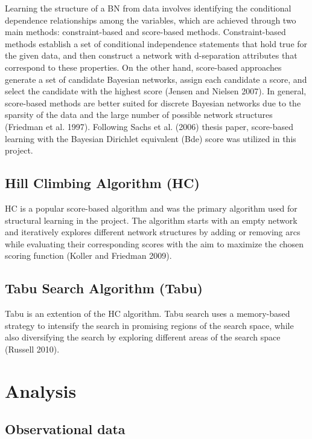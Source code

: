 \documentclass[twocol]{ametsoc}
\begin{document}
Learning the structure of a BN from data involves identifying the
conditional dependence relationships among the variables, which are
achieved through two main methods: constraint-based and score-based
methods. Constraint-based methods establish a set of conditional
independence statements that hold true for the given data, and then
construct a network with d-separation attributes that correspond to
these properties. On the other hand, score-based approaches generate a
set of candidate Bayesian networks, assign each candidate a score, and
select the candidate with the highest score (Jensen and Nielsen 2007).
In general, score-based methods are better suited for discrete Bayesian
networks due to the sparsity of the data and the large number of
possible network structures (Friedman et al. 1997). Following Sachs et
al. (2006) thesis paper, score-based learning with the Bayesian
Dirichlet equivalent (Bde) score was utilized in this project.

\hypertarget{hill-climbing-algorithm-hc}{%
\subsection{Hill Climbing Algorithm
(HC)}\label{hill-climbing-algorithm-hc}}

HC is a popular score-based algorithm and was the primary algorithm used
for structural learning in the project. The algorithm starts with an
empty network and iteratively explores different network structures by
adding or removing arcs while evaluating their corresponding scores with
the aim to maximize the chosen scoring function (Koller and Friedman
2009).

\hypertarget{tabu-search-algorithm-tabu}{%
\subsection{Tabu Search Algorithm
(Tabu)}\label{tabu-search-algorithm-tabu}}

Tabu is an extention of the HC algorithm. Tabu search uses a
memory-based strategy to intensify the search in promising regions of
the search space, while also diversifying the search by exploring
different areas of the search space (Russell 2010).

\hypertarget{analysis}{%
\section{Analysis}\label{analysis}}

\hypertarget{observational-data}{%
\subsection{Observational data}\label{observational-data}}
\end{document}

